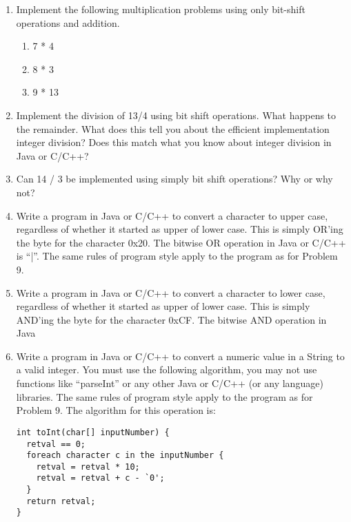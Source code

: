 \documentclass[12pt]{article}
\begin{document}
\begin{enumerate}
    \item Implement the following multiplication problems using only bit-shift operations and addition.
    \begin{enumerate}
      \item 7 * 4
      \item 8 * 3
      \item 9 * 13
    \end{enumerate}

    \item Implement the division of 13/4 using bit shift operations. What happens to the remainder. What does this tell you about the efficient implementation integer division? Does this match what you know about integer division in Java or C/C++?

    \item Can 14 / 3 be implemented using simply bit shift operations? Why or why not?

    \item Write a program in Java or C/C++ to convert a character to upper case, regardless of whether it started as upper of lower case. This is simply OR’ing the byte for the character 0x20. The bitwise OR operation in Java or C/C++ is “|”. The same rules of program style apply to the program as for Problem 9.

    \item Write a program in Java or C/C++ to convert a character to lower case, regardless of whether it started as upper of lower case. This is simply AND’ing the byte for the character 0xCF. The bitwise AND operation in Java

    \item Write a program in Java or C/C++ to convert a numeric value in a String to a valid integer. You must use the following algorithm, you may not use functions like “parseInt” or any other Java or C/C++ (or any language) libraries. The same rules of program style apply to the program as for Problem 9. The algorithm for this operation is:


\begin{lstlisting}
int toInt(char[] inputNumber) {
  retval == 0;
  foreach character c in the inputNumber {
    retval = retval * 10;
    retval = retval + c - `0';
  }
  return retval;
}
\end{lstlisting}

  \end{enumerate}
\end{document}
